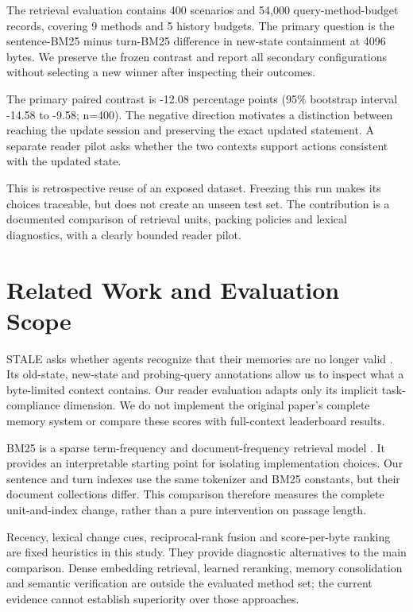 \documentclass{article}
\begin{document}
The retrieval evaluation contains 400 scenarios and 54,000 query-method-budget records, covering 9 methods and 5 history budgets. The primary question is the sentence-BM25 minus turn-BM25 difference in new-state containment at 4096 bytes. We preserve the frozen contrast and report all secondary configurations without selecting a new winner after inspecting their outcomes.

The primary paired contrast is -12.08 percentage points (95\% bootstrap interval -14.58 to -9.58; n=400). The negative direction motivates a distinction between reaching the update session and preserving the exact updated statement. A separate reader pilot asks whether the two contexts support actions consistent with the updated state.

This is retrospective reuse of an exposed dataset. Freezing this run makes its choices traceable, but does not create an unseen test set. The contribution is a documented comparison of retrieval units, packing policies and lexical diagnostics, with a clearly bounded reader pilot.

\section{Related Work and Evaluation Scope}
STALE asks whether agents recognize that their memories are no longer valid \citep{stale}. Its old-state, new-state and probing-query annotations allow us to inspect what a byte-limited context contains. Our reader evaluation adapts only its implicit task-compliance dimension. We do not implement the original paper's complete memory system or compare these scores with full-context leaderboard results.

BM25 is a sparse term-frequency and document-frequency retrieval model \citep{bm25}. It provides an interpretable starting point for isolating implementation choices. Our sentence and turn indexes use the same tokenizer and BM25 constants, but their document collections differ. This comparison therefore measures the complete unit-and-index change, rather than a pure intervention on passage length.

Recency, lexical change cues, reciprocal-rank fusion and score-per-byte ranking are fixed heuristics in this study. They provide diagnostic alternatives to the main comparison. Dense embedding retrieval, learned reranking, memory consolidation and semantic verification are outside the evaluated method set; the current evidence cannot establish superiority over those approaches.
\end{document}
